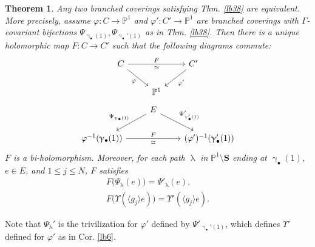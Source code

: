 \documentclass[12pt,a4paper,notitlepage]{article}
\theoremstyle{definition}
\theoremstyle{plain}
\newtheorem{thm}[df]{Theorem}
\newcommand{\bk}[1]{\langle {#1}\rangle}
\newcommand{\blt}{\bullet}
\newcommand{\Pbb}{\mathbb P}
\newcommand{\Sbf}{\mathbf{S}}
\numberwithin{equation}{subsection}
\begin{document}
\begin{thm}\label{lb29}
Any two branched coverings satisfying Thm. \ref{lb38} are equivalent. More precisely, assume $\varphi:C\rightarrow\Pbb^1$ and $\varphi':C'\rightarrow\Pbb^1$ are branched coverings with $\Gamma$-covariant bijections $\Psi_{\upgamma_\blt(1)},\Psi_{\upgamma_\blt'(1)}$ as in Thm. \ref{lb38}. Then there is a unique holomorphic map $F:C\rightarrow C'$ such that  the following diagrams commute:
\begin{equation}\label{eq6}
\begin{tikzcd}
C \arrow[rr, "F","\simeq"'] \arrow[dr, "\varphi"'] && C' \arrow[dl, "\varphi'"] \\
&  \Pbb^1
\end{tikzcd}	
\end{equation}
\begin{equation}\label{eq68}
\begin{tikzcd}
&E \arrow[dl, "\Psi_{\upgamma_\blt(1)}"'] \arrow[dr,  "{\Psi'_{\upgamma_\blt'(1)}}"]\\
\varphi^{-1}(\upgamma_\blt(1))\arrow[rr, "F", "\simeq"'] && (\varphi')^{-1}(\upgamma_\blt'(1))
\end{tikzcd}
\end{equation}
$F$ is a bi-holomorphism. Moreover, for each path $\uplambda$ in $\Pbb^1\setminus\Sbf$ ending at $\upgamma_\blt(1)$, $e\in E$, and $1\leq j\leq N$, $F$ satisfies 
\begin{gather*}
F\big(\Psi_\uplambda(e)\big)=\Psi'_\uplambda(e),\\
F\big(\Upsilon(\bk{g_j}e)\big)=\Upsilon'(\bk{g_j}e).
\end{gather*}
\end{thm}

Note that $\Psi_\uplambda'$ is the trivilization for $\varphi'$ defined by $\Psi'_{\upgamma_\blt'(1)}$, which defines $\Upsilon'$  defined for $\varphi'$ as in Cor. \ref{lb6}.
\end{document}
